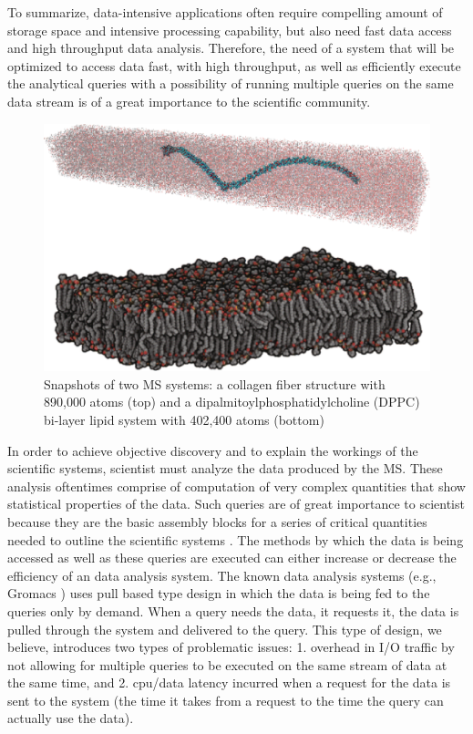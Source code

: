 \documentclass[10pt,journal,final,letterpaper,twocolumn]{IEEEtran}
\begin{document}
To summarize, data-intensive applications often require compelling
amount of storage space and intensive processing capability, but
also need fast data access and high throughput data analysis.
Therefore, the need of a system that will be optimized to access
data fast, with high throughput, as well as efficiently execute the
analytical queries with a possibility of running multiple queries on
the same data stream is of a great importance to the scientific
community.

\begin{figure}
 \centerline{ \includegraphics[width=1\columnwidth]{images/sample_snapshot_of_simulation.eps} }
 \caption{ Snapshots of two MS systems: a collagen fiber structure with 890,000 atoms (top) and a dipalmitoylphosphatidylcholine (DPPC) bi-layer lipid system with 402,400 atoms (bottom) \cite{mainArticle} }
 \label{fg:collagen_dipal}
\end{figure}

In order to achieve objective discovery and to explain the workings
of the scientific systems, scientist must analyze the data produced
by the MS. These analysis oftentimes comprise of computation of very
complex quantities that show statistical properties of the data.
Such queries are of great importance to scientist because they are
the basic assembly blocks for a series of critical quantities needed
to outline the scientific systems \cite{Frenkel:api01}. The methods
by which the data is being accessed as well as these queries are
executed can either increase or decrease the efficiency of an data
analysis system. The known data analysis systems (e.g., Gromacs
\cite{Gromacs-online}) uses pull based type design in which the data
is being fed to the queries only by demand. When a query needs the
data, it requests it, the data is pulled through the system and
delivered to the query. This type of design, we believe, introduces
two types of problematic issues: 1. overhead in I/O traffic by not
allowing for multiple queries to be executed on the same stream of
data at the same time, and 2. cpu/data latency incurred when a
request for the data is sent to the system (the time it takes from a
request to the time the query can actually use the data).
\end{document}
